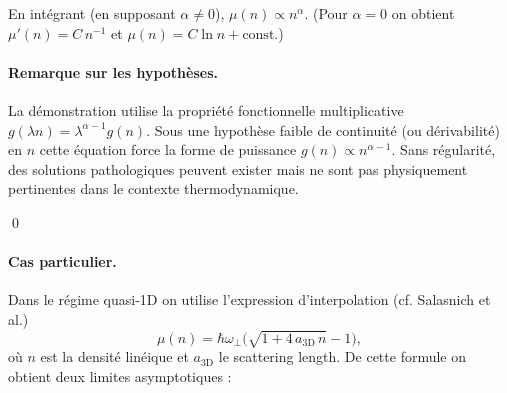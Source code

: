 En intégrant (en supposant \(\alpha\neq 0\)),
\(\mu(n)\propto n^\alpha\). (Pour \(\alpha=0\) on obtient \(\mu'(n)=C\,n^{-1}\) et \(\mu(n)=C\ln n+\text{const}\).)

\paragraph{Remarque sur les hypothèses.}
La démonstration utilise la propriété fonctionnelle multiplicative
\(g(\lambda n)=\lambda^{\alpha-1}g(n)\). Sous une hypothèse faible de continuité (ou dérivabilité) en \(n\) cette équation force la forme de puissance \(g(n)\propto n^{\alpha-1}\). Sans régularité, des solutions pathologiques peuvent exister mais ne sont pas physiquement pertinentes dans le contexte thermodynamique.

\qed

%
%
%
%

\paragraph{Cas particulier.}
Dans le régime quasi-1D on utilise l'expression d'interpolation (cf. Salasnich et al.)
\[
\mu(n)=\hbar\omega_\perp\Big(\sqrt{1+4\,a_{\mathrm{3D}}\,n}-1\Big),
\]
où \(n\) est la densité linéique et \(a_{\mathrm{3D}}\) le scattering length. De cette formule on obtient deux limites asymptotiques :

